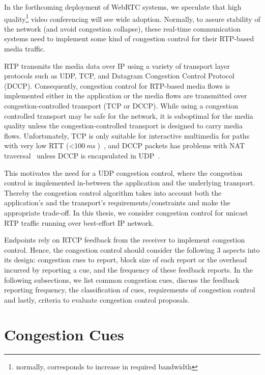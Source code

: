In the forthcoming deployment of WebRTC systems, we speculate that high
quality\footnote{normally, corresponds to increase in required bandwidth}
video conferencing will see wide adoption. Normally, to assure stability of
the network (and avoid congestion collapse), these real-time communication
systems need to implement some kind of congestion control for their RTP-based
media traffic.

RTP transmits the media data over IP using a variety of transport layer
protocols such as UDP, TCP, and Datagram Congestion Control Protocol (DCCP).
Consequently, congestion control for RTP-based media flows is implemented
either in the application or the media flows are transmitted over
congestion-controlled transport (TCP or DCCP). While using a congestion
controlled transport may be safe for the network, it is suboptimal for the
media quality unless the congestion-controlled transport is designed to carry
media flows. Unfortunately, TCP is only suitable for interactive multimedia
for paths with very low RTT (<100\,\emph{ms} )~\cite{Brosh:tcp-real-time}, and
DCCP packets has problems with NAT traversal~\cite{schier:DCCP} unless DCCP is
encapsulated in UDP~\cite{RFC6773}.

This motivates the need for a UDP congestion control, where the congestion
control is implemented in-between the application and the underlying
transport. Thereby the congestion control algorithm takes into account both
the application's and the transport's requirements/constraints and make the
appropriate trade-off. In this thesis, we consider congestion control for
unicast RTP traffic running over best-effort IP network.


Endpoints rely on RTCP feedback from the receiver to implement congestion
control. Hence, the congestion control should consider the following 3 aspects
into its design: congestion cues to report, block size of each report or the
overhead incurred by reporting a cue, and the frequency of these feedback
reports. In the following subsections, we list common congestion cues, discuss
the feedback reporting frequency, the classification of cues, requirements of
congestion control and lastly, criteria to evaluate congestion control
proposals.

\section{Congestion Cues}
\label{fw.cues}

